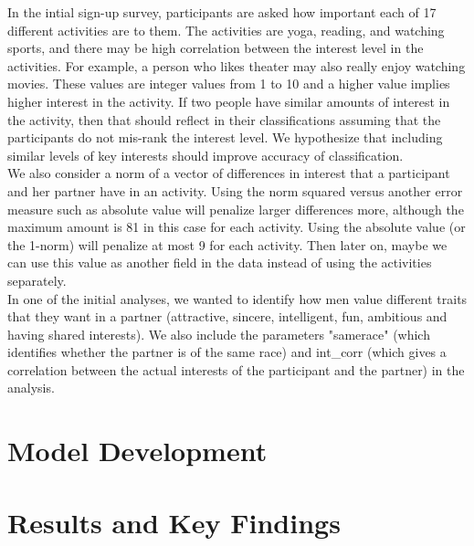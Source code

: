 \documentclass{article}
\begin{document}
In the intial sign-up survey, participants are asked how important each of 17 different activities are to them.  The activities are yoga, reading, and watching sports, and there may be high correlation between the interest level in the activities.  For example, a person who likes theater may also really enjoy watching movies.  These values are integer values from 1 to 10 and a higher value implies higher interest in the activity.  If two people have similar amounts of interest in the activity, then that should reflect in their classifications assuming that the participants do not mis-rank the interest level. We hypothesize that including similar levels of key interests should improve accuracy of classification.\\

We also consider a norm of a vector of differences in interest that a participant and her partner have in an activity.  Using the norm squared versus another error measure such as absolute value will penalize larger differences more, although the maximum amount is 81 in this case for each activity. Using the absolute value (or the 1-norm) will penalize at most 9 for each activity. Then later on, maybe we can use this value as another field in the data instead of using the activities separately. \\

In one of the initial analyses, we wanted to identify how men value different traits that they want in a partner (attractive, sincere, intelligent, fun, ambitious and having shared interests). We also include the parameters "samerace" (which identifies whether the partner is of the same race) and int\_corr (which gives a correlation between the actual interests of the participant and the partner) in the analysis. %


 
\section{Model Development}
 
\section{Results and Key Findings}
\end{document}

